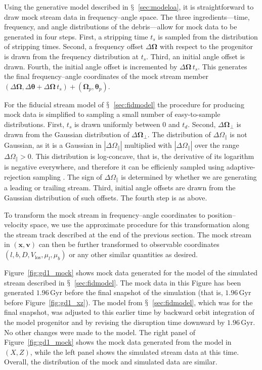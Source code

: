 \documentclass[12pt,preprint]{aastex}
\renewcommand{\figurename}{Figure}
\newcommand{\sectionname}{$\mathsection$}
\renewcommand{\vec}[1]{\ensuremath{\mathbf{#1}}}
\newcommand{\vecx}{\ensuremath{\vec{x}}}
\newcommand{\vecv}{\ensuremath{\vec{v}}}
\newcommand{\veco}{\ensuremath{\vec{\Omega}}}
\newcommand{\veca}{\ensuremath{\boldsymbol\theta}}
\newcommand{\Gyr}{\ensuremath{\,\mathrm{Gyr}}}
\newcommand{\opar}{\ensuremath{\Omega_\parallel}}
\newcommand{\operp}{\ensuremath{\veco_\perp}}
\newcommand{\vlos}{\ensuremath{V_{\mathrm{los}}}}
\newcommand{\pmll}{\ensuremath{\mu_l}}
\newcommand{\pmbb}{\ensuremath{\mu_b}}
\begin{document}
Using the generative model described in
\sectionname~\ref{sec:modeloa}, it is straightforward to draw mock
stream data in frequency--angle space. The three ingredients---time,
frequency, and angle distributions of the debris---allow for mock data
to be generated in four steps. First, a stripping time $t_s$ is
sampled from the distribution of stripping times. Second, a frequency
offset $\Delta \veco$ with respect to the progenitor is drawn from the
frequency distribution at $t_s$. Third, an initial angle offset is
drawn. Fourth, the initial angle offset is incremented by $\Delta
\veco \,t_s$. This generates the final frequency--angle coordinates of
the mock stream member $(\Delta \veco,\Delta \veca+\Delta \veco\,t_s)
+ (\veco_p,\veca_p)$.

For the fiducial stream model of \sectionname~\ref{sec:fidmodel} the
procedure for producing mock data is simplified to sampling a small
number of easy-to-sample distributions. First, $t_s$ is drawn
uniformly between $0$ and $t_d$. Second, $\Delta \operp$ is drawn from
the Gaussian distribution of $\Delta \operp$. The distribution of
$\Delta \opar$ is not Gaussian, as it is a Gaussian in $|\Delta
\opar|$ multiplied with $|\Delta \opar|$ over the range $\Delta \opar
> 0$. This distribution is log-concave, that is, the derivative of its
logarithm is negative everywhere, and therefore it can be efficienly
sampled using adaptive-rejection sampling \citep{Gilks92a}. The sign
of $\Delta \opar$ is determined by whether we are generating a leading
or trailing stream. Third, initial angle offsets are drawn from the
Gaussian distribution of such offsets. The fourth step is as above.

To transform the mock stream in frequency--angle coordinates to
position--velocity space, we use the approximate procedure for this
transformation along the stream track described at the end of the
previous section. The mock stream in $(\vecx,\vecv)$ can then be
further transformed to observable coordinates
$(l,b,D,\vlos,\pmll,\pmbb)$ or any other similar quantities as
desired.

\figurename~\ref{fig:gd1_mock} shows mock data generated for the model
of the simulated stream described in
\sectionname~\ref{sec:fidmodel}. The mock data in this Figure has been
generated $1.96\Gyr$ before the final snapshot of the simulation (that
is, $1.96\Gyr$ before \figurename~\ref{fig:gd1_xz}). The model
from \sectionname~\ref{sec:fidmodel}, which was for the final
snapshot, was adjusted to this earlier time by backward orbit
integration of the model progenitor and by revising the disruption
time downward by $1.96\Gyr$. No other changes were made to the
model. The right panel of \figurename~\ref{fig:gd1_mock} shows the
mock data generated from the model in $(X,Z)$, while the left panel
shows the simulated stream data at this time. Overall, the
distribution of the mock and simulated data are similar.
\end{document}
